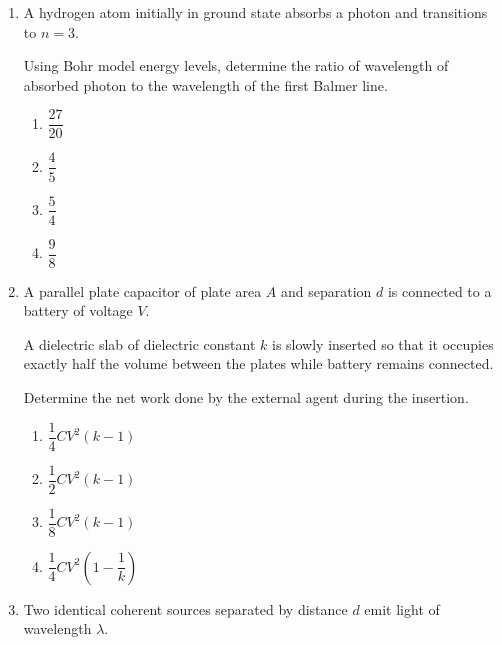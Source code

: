 \documentclass[12pt]{article}
\begin{document}
\begin{enumerate}[leftmargin=*]
The block oscillates on a frictionless surface.  
Now the entire system is accelerated horizontally with constant acceleration $a$.  

Determine the new equilibrium displacement of the block from the original central position.

\begin{enumerate}
\item $\dfrac{ma}{2k}$
\item $\dfrac{ma}{k}$
\item $\dfrac{2ma}{k}$
\item Zero
\end{enumerate}

\item A hydrogen atom initially in ground state absorbs a photon and transitions to $n=3$.  

Using Bohr model energy levels, determine the ratio of wavelength of absorbed photon to the wavelength of the first Balmer line.

\begin{enumerate}
\item $\dfrac{27}{20}$
\item $\dfrac{4}{5}$
\item $\dfrac{5}{4}$
\item $\dfrac{9}{8}$
\end{enumerate}

\item A parallel plate capacitor of plate area $A$ and separation $d$ is connected to a battery of voltage $V$.  

A dielectric slab of dielectric constant $k$ is slowly inserted so that it occupies exactly half the volume between the plates while battery remains connected.  

Determine the net work done by the external agent during the insertion.

\begin{enumerate}
\item $\dfrac{1}{4}CV^2(k-1)$
\item $\dfrac{1}{2}CV^2(k-1)$
\item $\dfrac{1}{8}CV^2(k-1)$
\item $\dfrac{1}{4}CV^2\left(1-\dfrac{1}{k}\right)$
\end{enumerate}

\item Two identical coherent sources separated by distance $d$ emit light of wavelength $\lambda$.  


\end{enumerate}
\end{document}
